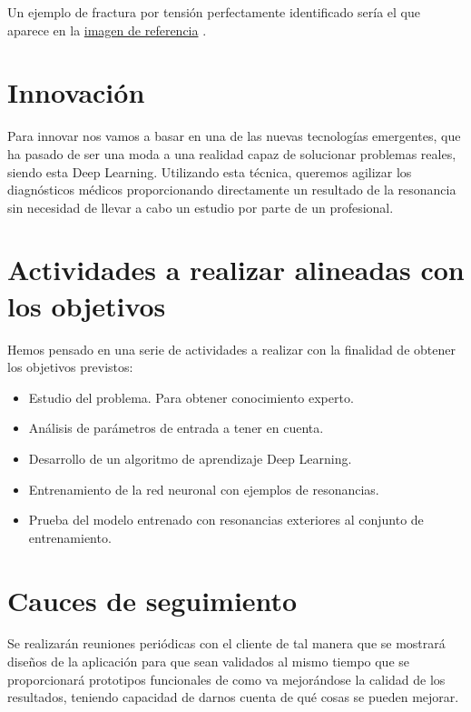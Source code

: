 Un ejemplo de fractura por tensión perfectamente identificado sería el que aparece en la \href{https://www.google.es/search?q=resonancia+magnetica+con+fractura&source=lnms&tbm=isch&sa=X&ved=0ahUKEwj_ydaisK7eAhVDgRoKHeGoDsUQ_AUIDigB&biw=1536&bih=754#imgrc=5wcLStUv22LjAM:}{imagen de referencia} \cite{misc:imagen}.

\section{Innovación}

Para innovar nos vamos a basar en una de las nuevas tecnologías emergentes, que ha pasado de ser una moda a una realidad capaz de solucionar problemas reales, siendo esta Deep Learning. Utilizando esta técnica, queremos agilizar los diagnósticos médicos proporcionando directamente un resultado de la resonancia sin necesidad de llevar a cabo un estudio por parte de un profesional.

\section{Actividades a realizar alineadas con los objetivos}

Hemos pensado en una serie de actividades a realizar con la finalidad de obtener los objetivos previstos:

\begin{itemize}
	\item Estudio del problema. Para obtener conocimiento experto.
	\item Análisis de parámetros de entrada a tener en cuenta.
	\item Desarrollo de un algoritmo de aprendizaje Deep Learning.
	\item Entrenamiento de la red neuronal con ejemplos de resonancias.
	\item Prueba del modelo entrenado con resonancias exteriores al conjunto de entrenamiento.
\end{itemize}

\section{Cauces de seguimiento}

Se realizarán reuniones periódicas con el cliente de tal manera que se mostrará diseños de la aplicación para que sean validados al mismo tiempo que se proporcionará prototipos funcionales de como va mejorándose la calidad de los resultados, teniendo capacidad de darnos cuenta de qué cosas se pueden mejorar.

